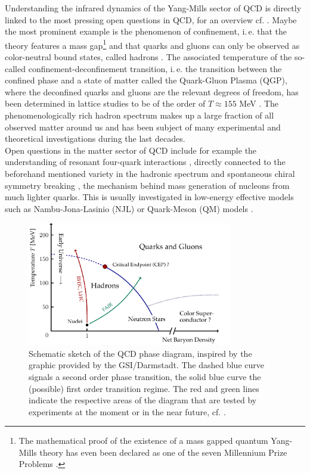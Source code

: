 Understanding the infrared dynamics of the Yang-Mills sector of QCD is directly linked to the most pressing open questions in QCD, for an overview cf. \cite{Brambilla2014}. Maybe the most prominent example is the phenomenon of confinement, i.\,e. that the theory features a mass gap\footnote{The mathematical proof of the existence of a mass gapped quantum Yang-Mills theory has even been declared as one of the seven Millennium Prize Problems \cite{JaffeWitten2009}.} and that quarks and gluons can only be observed as color-neutral bound states, called hadrons \cite{vonSmekalAlkoferHauck1997, AlkoferVonSmekal2000, LercheVonSmekal2002, FischerMaasPawlowski2008,CyrolFisterMitterPawlowskiStrodthoff2016}. The associated temperature of the so-called confinement-deconfinement transition, i.\,e. the transition between the confined phase and a state of matter called the Quark-Gluon Plasma (QGP), where the deconfined quarks and gluons are the relevant degrees of freedom, has been determined in lattice studies to be of the order of $T\approx 155$ MeV \cite{AokiFodorKatzSzabo2006}. The phenomenologically rich hadron spectrum makes up a large fraction of all observed matter around us and has been subject of many experimental and theoretical investigations during the last decades.\\ Open questions in the matter sector of QCD include for example the understanding of resonant four-quark interactions \cite{Eichmann2020}, directly connected to the beforehand mentioned variety in the hadronic spectrum and spontaneous chiral symmetry breaking \cite{MitterPawlowskiStrodthoff2014}, the mechanism behind mass generation of nucleons from much lighter quarks. This is usually investigated in low-energy effective models such as Nambu-Jona-Lasinio (NJL) or Quark-Meson (QM) models \cite{NambuJonaLasinio1961, Tetradis2003}. \\ 
\begin{figure}[t]
\centering
\includegraphics[width=0.8\textwidth]{figs/tikz/qcd_phase_diagram}
\caption[Schematic sketch of the QCD phase diagram.]{Schematic sketch of the QCD phase diagram, inspired by the graphic provided by the GSI/Darmstadt. The dashed blue curve signals a second order phase transition, the solid blue curve the (possible) first order transition regime. The red and green lines indicate the respective areas of the diagram that are tested by experiments at the moment or in the near future, cf. \cite{RHIC, LHC, FAIR, NICA}.}\label{fig:phase_diagram}
\end{figure}
